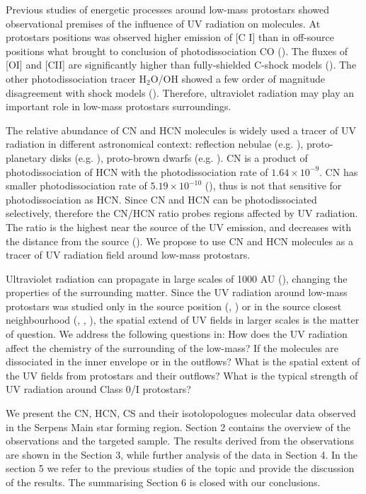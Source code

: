 \documentclass{aa}
\begin{document}
Previous studies of energetic processes around low-mass protostars showed observational premises of the influence of UV radiation on molecules. At protostars positions was observed higher emission of [C I] than in off-source positions what brought to conclusion of photodissociation CO (\citealt{vKe09}). The fluxes of [OI] and [CII] are significantly higher than fully-shielded C-shock models (\citealt{Kar18}). The other photodissociation tracer H$_2$O/OH showed a few order of magnitude disagreement with shock models (\citealt{Kar14}). Therefore, ultraviolet radiation may play an important role in low-mass protostars surroundings. 

The relative abundance of CN and HCN molecules is widely used a tracer of UV radiation in different astronomical context: reflection nebulae (e.g. \citealt{Fue95}), proto-planetary disks (e.g. \citealt{Cha12}), proto-brown dwarfs (e.g. \citealt{Ria18}). CN is a product of photodissociation of HCN with the photodissociation rate of $1.64\times10^{-9}$. CN has smaller photodissociation rate of $5.19\times10^{-10}$ (\citealt{Hea17}), thus is not that sensitive for photodissociation as HCN. Since CN and HCN can be photodissociated selectively, therefore the CN/HCN ratio probes regions affected by UV radiation. The ratio is the highest near the source of the UV emission, and decreases with the distance from the source (\citealt{Fue93}). We propose to use CN and HCN molecules as a tracer of UV radiation field around low-mass protostars.

Ultraviolet radiation can propagate in large scales of 1000 AU (\citealt{Kri17}), changing the properties of the surrounding matter. Since the UV radiation around low-mass protostars was studied only in the source position (\citealt{Sta07}, \citealt{Ria18}) or in the source closest neighbourhood (\citealt{Hog99}, \citealt{Bac01}, \citealt{Jor04}), the spatial extend of UV fields in larger scales is the matter of question. We address the following questions in: How does the UV radiation affect the chemistry of the surrounding of the low-mass? If the molecules are dissociated in the inner envelope or in the outflows? What is the spatial extent of the UV fields from protostars and their outflows? What is the typical strength of UV radiation around Class 0/I protostars? 

We present the CN, HCN, CS and their isotolopologues molecular data observed in the Serpens Main star forming region. Section 2 contains the overview of the observations and the targeted sample. The results derived from the observations are shown in the Section 3, while further analysis of the data in Section 4. In the section 5 we refer to the previous studies of the topic and provide the discussion of the results. The summarising Section 6 is closed with our conclusions.
\end{document}
